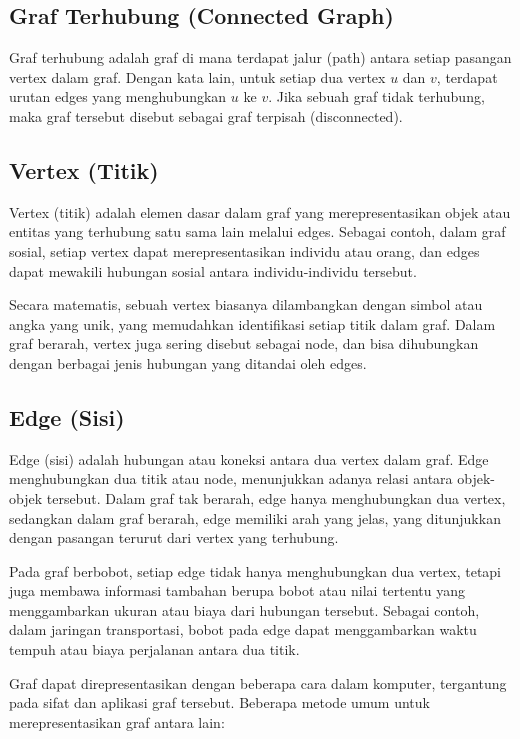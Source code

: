 \subsection{Graf Terhubung (Connected Graph)}
Graf terhubung adalah graf di mana terdapat jalur (path) antara setiap pasangan vertex dalam graf. Dengan kata lain, untuk setiap dua vertex \( u \) dan \( v \), terdapat urutan edges yang menghubungkan \( u \) ke \( v \). Jika sebuah graf tidak terhubung, maka graf tersebut disebut sebagai graf terpisah (disconnected).

\subsection{Vertex (Titik)}
Vertex (titik) adalah elemen dasar dalam graf yang merepresentasikan objek atau entitas yang terhubung satu sama lain melalui edges. Sebagai contoh, dalam graf sosial, setiap vertex dapat merepresentasikan individu atau orang, dan edges dapat mewakili hubungan sosial antara individu-individu tersebut.

Secara matematis, sebuah vertex biasanya dilambangkan dengan simbol atau angka yang unik, yang memudahkan identifikasi setiap titik dalam graf. Dalam graf berarah, vertex juga sering disebut sebagai node, dan bisa dihubungkan dengan berbagai jenis hubungan yang ditandai oleh edges.

\subsection{Edge (Sisi)}
Edge (sisi) adalah hubungan atau koneksi antara dua vertex dalam graf. Edge menghubungkan dua titik atau node, menunjukkan adanya relasi antara objek-objek tersebut. Dalam graf tak berarah, edge hanya menghubungkan dua vertex, sedangkan dalam graf berarah, edge memiliki arah yang jelas, yang ditunjukkan dengan pasangan terurut dari vertex yang terhubung.

Pada graf berbobot, setiap edge tidak hanya menghubungkan dua vertex, tetapi juga membawa informasi tambahan berupa bobot atau nilai tertentu yang menggambarkan ukuran atau biaya dari hubungan tersebut. Sebagai contoh, dalam jaringan transportasi, bobot pada edge dapat menggambarkan waktu tempuh atau biaya perjalanan antara dua titik.

Graf dapat direpresentasikan dengan beberapa cara dalam komputer, tergantung pada sifat dan aplikasi graf tersebut. Beberapa metode umum untuk merepresentasikan graf antara lain:

